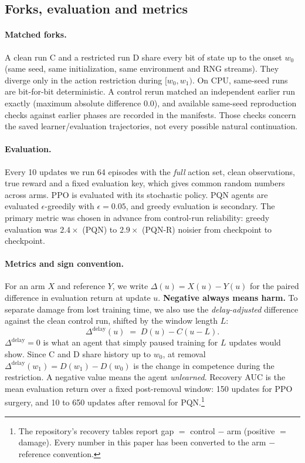 \documentclass[10pt]{article} %
\newcommand{\Ddel}{\Delta^{\mathrm{delay}}}
\begin{document}
\subsection{Forks, evaluation and metrics}

\paragraph{Matched forks.}
A clean run C and a restricted run D share every bit of state up to the onset $w_0$ (same seed, same initialization, same environment and RNG streams). They diverge only in the action restriction during $[w_0,w_1)$. On CPU, same-seed runs are bit-for-bit deterministic. A control rerun matched an independent earlier run exactly (maximum absolute difference 0.0), and available same-seed reproduction checks against earlier phases are recorded in the manifests. Those checks concern the saved learner/evaluation trajectories, not every possible natural continuation.

\paragraph{Evaluation.}
Every 10 updates we run 64 episodes with the \emph{full} action set, clean observations, true reward and a fixed evaluation key, which gives common random numbers across arms. PPO is evaluated with its stochastic policy. PQN agents are evaluated $\epsilon$-greedily with $\epsilon=0.05$, and greedy evaluation is secondary. The primary metric was chosen in advance from control-run reliability: greedy evaluation was $2.4\times$ (PQN) to $2.9\times$ (PQN-R) noisier from checkpoint to checkpoint.

\paragraph{Metrics and sign convention.}
For an arm $X$ and reference $Y$, we write $\Delta(u)=X(u)-Y(u)$ for the paired difference in evaluation return at update $u$. \textbf{Negative always means harm.} To separate damage from lost training time, we also use the \emph{delay-adjusted} difference against the clean control run, shifted by the window length $L$:
\begin{equation}
\Ddel(u) \;=\; D(u) - C(u-L).
\end{equation}
$\Ddel=0$ is what an agent that simply paused training for $L$ updates would show. Since C and D share history up to $w_0$, at removal $\Ddel(w_1)=D(w_1)-D(w_0)$ is the change in competence during the restriction. A negative value means the agent \emph{unlearned}. Recovery AUC is the mean evaluation return over a fixed post-removal window: 150 updates for PPO surgery, and 10 to 650 updates after removal for PQN.\footnote{The repository's recovery tables report gap $=$ control $-$ arm (positive $=$ damage). Every number in this paper has been converted to the arm $-$ reference convention.}
\end{document}
